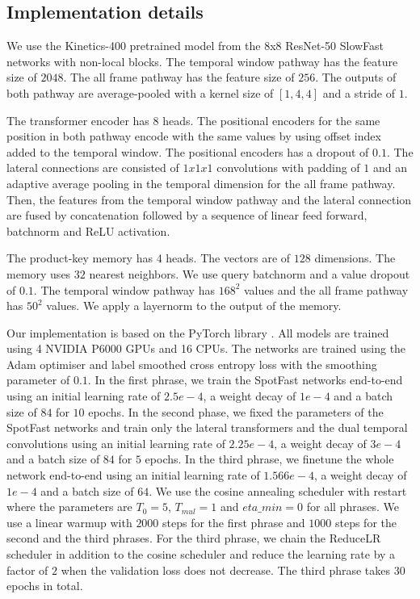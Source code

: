 \documentclass{article}
\begin{document}
\subsection{Implementation details}
We use the Kinetics-400 pretrained model from the 8x8 ResNet-50 SlowFast networks with non-local blocks. The temporal window pathway has the feature size of $2048$. The all frame pathway has the feature size of $256$. The outputs of both pathway are average-pooled with a kernel size of $[1,4,4]$ and a stride of $1$. 

The transformer encoder has $8$ heads. The positional encoders for the same position in both pathway encode with the same values by using offset index added to the temporal window. The positional encoders has a dropout of $0.1$. The lateral connections are consisted of $1x1x1$ convolutions with padding of $1$ and an adaptive average pooling in the temporal dimension for the all frame pathway. Then, the features from the temporal window pathway and the lateral connection are fused by concatenation followed by a sequence of linear feed forward, batchnorm and ReLU activation. 

The product-key memory has $4$ heads. The vectors are of $128$ dimensions. The memory uses $32$ nearest neighbors. We use query batchnorm and a value dropout of $0.1$. The temporal window pathway has $168^2$ values and the all frame pathway has $50^2$ values. We apply a layernorm to the output of the memory. 

Our implementation is based on the PyTorch library \cite{paszke2019pytorch}. All models are trained using 4 NVIDIA P6000 GPUs and 16 CPUs. The networks are trained using the Adam optimiser \cite{kingma2014adam} and label smoothed cross entropy loss with the smoothing parameter of $0.1$. In the first phrase, we train the SpotFast networks end-to-end using an initial learning rate of $2.5e-4$, a weight decay of $1e-4$ and a batch size of $84$ for $10$ epochs. In the second phase, we fixed the parameters of the SpotFast networks and train only the lateral transformers and the dual temporal convolutions using an initial learning rate of $2.25e-4$, a weight decay of $3e-4$ and a batch size of $84$ for $5$ epochs. In the third phrase, we finetune the whole network end-to-end using an initial learning rate of $1.566e-4$, a weight decay of $1e-4$ and a batch size of $64$. We use the cosine annealing scheduler with restart \cite{loshchilov2016sgdr} where the parameters are $T_0=5$, $T_{mul}=1$ and $eta\_min=0$ for all phrases. We use a linear warmup with $2000$ steps for the first phrase and $1000$ steps for the second and the third phrases. For the third phrase, we chain the ReduceLR scheduler in addition to the cosine scheduler and reduce the learning rate by a factor of $2$ when the validation loss does not decrease. The third phrase takes $30$ epochs in total.
\end{document}
